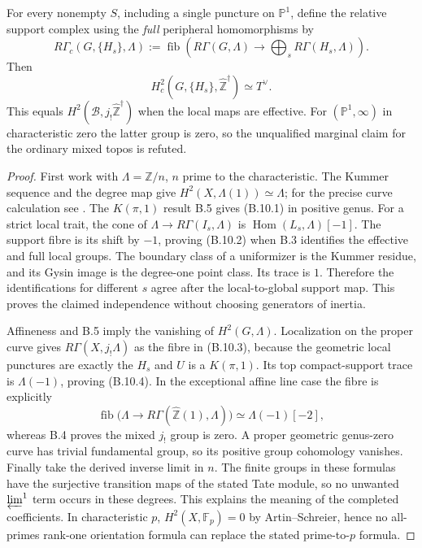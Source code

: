 For every nonempty $S$, including a single puncture on
$\mathbb P^1$, define the relative support complex using the
\emph{full} peripheral homomorphisms by
\[
 R\Gamma_c(G,\{H_s\},\Lambda)
 :=\operatorname{fib}\left(R\Gamma(G,\Lambda)
                  \longrightarrow\bigoplus_sR\Gamma(H_s,\Lambda)\right).
                                                               \tag{B.10.3}
\]
Then
\[
 H^2_c(G,\{H_s\},\widehat{\mathbb Z}^{\dagger})\simeq T^\vee.
                                                               \tag{B.10.4}
\]
This equals $H^2(\mathcal B,j_!\widehat{\mathbb Z}^{\dagger})$
when the local maps are effective. For
$(\mathbb P^1,\infty)$ in characteristic zero the latter
group is zero, so the unqualified marginal claim for the
ordinary mixed topos is refuted.

\begin{proof}
First work with $\Lambda=\mathbb Z/n$, $n$ prime to the
characteristic. The Kummer sequence and the degree map give
$H^2(X,\Lambda(1))\simeq\Lambda$; for the precise curve
calculation see \citet[Lemma~59.69.1]{StacksCurveKummer}.
The $K(\pi,1)$ result B.5 gives (B.10.1) in positive genus.
For a strict local trait, the cone of
$\Lambda\to R\Gamma(I_s,\Lambda)$ is
$\operatorname{Hom}(L_s,\Lambda)[-1]$. The support fibre is
its shift by $-1$, proving (B.10.2) when B.3 identifies the
effective and full local groups. The boundary class of a
uniformizer is the Kummer residue, and its Gysin image is
the degree-one point class. Its trace is $1$. Therefore the
identifications for different $s$ agree after the
local-to-global support map. This proves the claimed
independence without choosing generators of inertia.

Affineness and B.5 imply the vanishing of $H^2(G,\Lambda)$.
Localization on the proper curve gives
$R\Gamma(X,j_!\Lambda)$ as the fibre in (B.10.3), because
the geometric local punctures are exactly the $H_s$ and
$U$ is a $K(\pi,1)$. Its top compact-support trace is
$\Lambda(-1)$, proving (B.10.4). In the exceptional affine
line case the fibre is explicitly
\[
 \operatorname{fib}\bigl(\Lambda\to
 R\Gamma(\widehat{\mathbb Z}(1),\Lambda)\bigr)
                  \simeq\Lambda(-1)[-2],
\]
whereas B.4 proves the mixed $j_!$ group is zero. A proper
geometric genus-zero curve has trivial fundamental group,
so its positive group cohomology vanishes. Finally take the
derived inverse limit in $n$. The finite groups in these
formulas have the surjective transition maps of the stated
Tate module, so no unwanted $\varprojlim^1$ term occurs in
these degrees. This explains the meaning of the completed
coefficients. In characteristic $p$, $H^2(X,\mathbb F_p)=0$
by Artin--Schreier, hence no all-primes rank-one orientation
formula can replace the stated prime-to-$p$ formula.
\end{proof}

